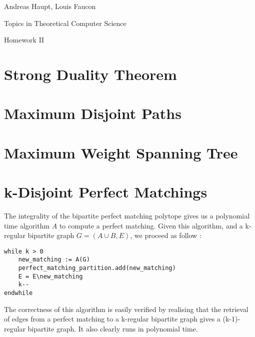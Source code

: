 \documentclass{scrartcl}
\newcommand\1{\mathbf{1}}
\begin{document}
Andreas Haupt, Louis Faucon

Topics in Theoretical Computer Science 

Homework II

\section{Strong Duality Theorem}

\section{Maximum Disjoint Paths}

\section{Maximum Weight Spanning Tree}

\section{k-Disjoint Perfect Matchings}

The integrality of the bipartite perfect matching polytope gives us a polynomial time algorithm $A$ to compute a perfect matching. Given this algorithm, and a k-regular bipartite graph $G = (A \cup B,E)$, we proceed as follow :

\begin{verbatim}
while k > 0
    new_matching := A(G) 
    perfect_matching_partition.add(new_matching)
    E = E\new_matching
    k--
endwhile
\end{verbatim}

The correctness of this algorithm is easily verified by realising that the retrieval of edges from a perfect matching to a k-regular bipartite graph gives a (k-1)-regular bipartite graph. It also clearly runs in polynomial time.
\end{document}
